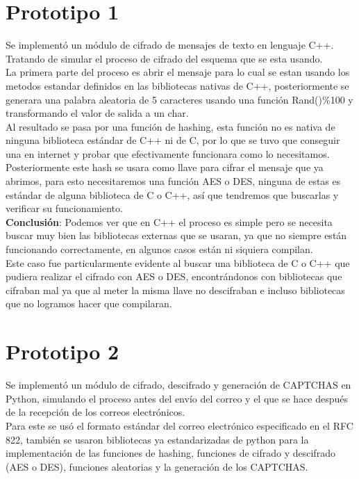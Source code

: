 \documentclass[12pt,oneside,onecolumn,openany]{report}
\begin{document}
\section{Prototipo 1}
Se implementó un módulo de cifrado de mensajes de texto en lenguaje C++. Tratando de simular el proceso de cifrado del esquema que se esta usando.\\
La primera parte del proceso es abrir el mensaje para lo cual se estan usando los metodos estandar definidos en las bibliotecas nativas de C++, posteriormente se generara una palabra aleatoria de 5 caracteres usando una función Rand()\%100 y transformando el valor de salida a un char.\\
Al resultado se pasa por una función de hashing, esta función no es nativa de ninguna biblioteca estándar de C++ ni de C, por lo que se tuvo que conseguir una en internet y probar que efectivamente funcionara como lo necesitamos.\\
Posteriormente este hash se usara como llave para cifrar el mensaje que ya abrimos, para esto necesitaremos una función AES o DES, ninguna de estas es estándar de alguna biblioteca de C o C++, así que tendremos que buscarlas y verificar su funcionamiento.\\


\textbf{Conclusión}:
Podemos ver que en C++ el proceso es simple pero se necesita buscar muy bien las bibliotecas externas que se usaran, ya que no siempre están funcionando correctamente, en algunos casos están ni siquiera compilan.\\
Este caso fue particularmente evidente al buscar una biblioteca de C o C++ que pudiera realizar el cifrado con AES o DES, encontrándonos con bibliotecas que cifraban mal ya que al meter la misma llave no descifraban e incluso bibliotecas que no logramos hacer que compilaran.\\

\section{Prototipo 2}
Se implementó un módulo de cifrado, descifrado y generación de CAPTCHAS en Python, simulando el proceso antes del envío del correo y el que se hace después de la recepción de los correos electrónicos.\\
Para este se usó el formato estándar del correo electrónico especificado en el RFC 822, también se usaron bibliotecas ya estandarizadas de python para la implementación de las funciones de hashing, funciones de cifrado y descifrado (AES o DES), funciones aleatorias y la generación de los CAPTCHAS.\\
\end{document}
